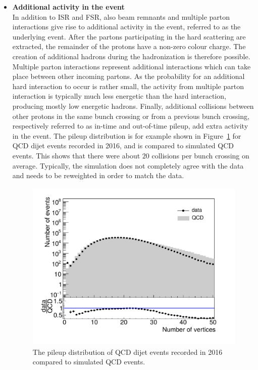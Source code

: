 \begin{itemize}
\item[] \textbf{Additional activity in the event}\\
In addition to \ac{ISR} and \ac{FSR}, also beam remnants and multiple parton interactions give rise to additional activity in the event, referred to as the underlying event. After the partons participating in the hard scattering are extracted, the remainder of the protons have a non-zero colour charge. The creation of additional hadrons during the hadronization is therefore possible. Multiple parton interactions represent additional interactions which can take place between other incoming partons. As the probability for an additional hard interaction to occur is rather small, the activity from multiple parton interaction is typically much less energetic than the hard interaction, producing mostly low energetic hadrons. Finally, additional collisions between other protons in the same bunch crossing or from a previous bunch crossing, respectively referred to as in-time and out-of-time pileup, add extra activity in the event. The pileup distribution is for example shown in Figure~\ref{fig:pileup} for QCD dijet events recorded in 2016, and is compared to simulated QCD events. This shows that there were about $20$ collisions per bunch crossing on average. Typically, the simulation does not completely agree with the data and needs to be reweighted in order to match the data.

\begin{figure}[ht]
  \centering
 \includegraphics[width=.75\textwidth]{pileup.pdf} 
 \caption{The pileup distribution of QCD dijet events recorded in 2016 compared to simulated QCD events.}
 \label{fig:pileup}
\end{figure}
 \end{itemize}

